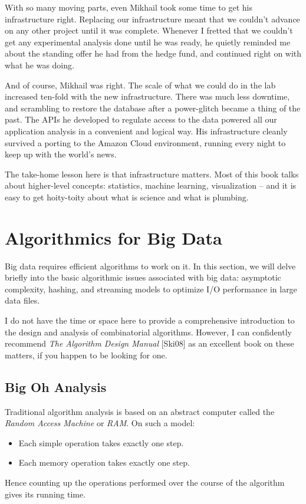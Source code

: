 \documentclass[10pt]{article}
\begin{document}
\begin{enumerate}
With so many moving parts, even Mikhail took some time to get his infrastructure right. Replacing our infrastructure meant that we couldn't advance on any other project until it was complete. Whenever I fretted that we couldn't get any experimental analysis done until he was ready, he quietly reminded me about the standing offer he had from the hedge fund, and continued right on with what he was doing.

And of course, Mikhail was right. The scale of what we could do in the lab increased ten-fold with the new infrastructure. There was much less downtime, and scrambling to restore the database after a power-glitch became a thing of the past. The APIs he developed to regulate access to the data powered all our application analysis in a convenient and logical way. His infrastructure cleanly survived a porting to the Amazon Cloud environment, running every night to keep up with the world's news.

The take-home lesson here is that infrastructure matters. Most of this book talks about higher-level concepts: statistics, machine learning, visualization – and it is easy to get hoity-toity about what is science and what is plumbing.

\section{Algorithmics for Big Data}
Big data requires efficient algorithms to work on it. In this section, we will delve briefly into the basic algorithmic issues associated with big data: asymptotic complexity, hashing, and streaming models to optimize I/O performance in large data files.

I do not have the time or space here to provide a comprehensive introduction to the design and analysis of combinatorial algorithms. However, I can confidently recommend \textit{The Algorithm Design Manual} [Ski08] as an excellent book on these matters, if you happen to be looking for one.

\subsection{Big Oh Analysis}
Traditional algorithm analysis is based on an abstract computer called the \textit{Random Access Machine} or \textit{RAM}. On such a model:
\begin{itemize}
    \item Each simple operation takes exactly one step.
    \item Each memory operation takes exactly one step.
\end{itemize}
Hence counting up the operations performed over the course of the algorithm gives its running time.


\end{enumerate}
\end{document}

